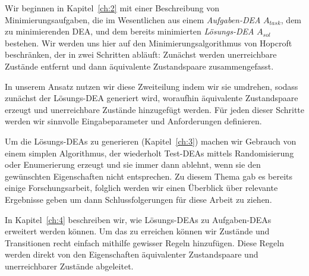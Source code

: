 Wir beginnen in Kapitel~\ref{ch:2} mit einer Beschreibung von Minimierungsaufgaben, die im Wesentlichen aus einem \emph{Aufgaben-DEA} $A_{task}$, dem zu minimierenden DEA, und dem bereits minimierten \emph{Lösungs-DEA} $A_{sol}$ bestehen. Wir werden uns hier auf den Minimierungsalgorithmus von Hopcroft beschränken, der in zwei Schritten abläuft: Zunächst werden unerreichbare Zustände entfernt und dann äquivalente Zustandspaare zusammengefasst.

In unserem Ansatz nutzen wir diese Zweiteilung indem wir sie umdrehen, sodass zunächst der Lösungs-DEA generiert wird, woraufhin äquivalente Zustandspaare erzeugt und unerreichbare Zustände hinzugefügt werden. Für jeden dieser Schritte werden wir sinnvolle Eingabeparameter und Anforderungen definieren.

Um die Lösungs-DEAs zu generieren (Kapitel~\ref{ch:3}) machen wir Gebrauch von einem simplen Algorithmus, der wiederholt Test-DEAs mittels Randomisierung oder Enumerierung erzeugt und sie immer dann ablehnt, wenn sie den gewünschten Eigenschaften nicht entsprechen. Zu diesem Thema gab es bereits einige Forschungsarbeit, folglich werden wir einen Überblick über relevante Ergebnisse geben um dann Schlussfolgerungen für diese Arbeit zu ziehen.

In Kapitel~\ref{ch:4} beschreiben wir, wie Lösungs-DEAs zu Aufgaben-DEAs erweitert werden können. Um das zu erreichen können wir Zustände und Transitionen recht einfach mithilfe gewisser Regeln hinzufügen. Diese Regeln werden direkt von den Eigenschaften äquivalenter Zustandspaare und unerreichbarer Zustände abgeleitet.
	
